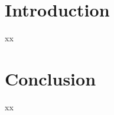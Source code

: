 
%
%
%
\section{Introduction}
\label{s:intro}
	xx
%
%
%
\section{Conclusion}
\label{s:concl}
	xx
%
%
%
